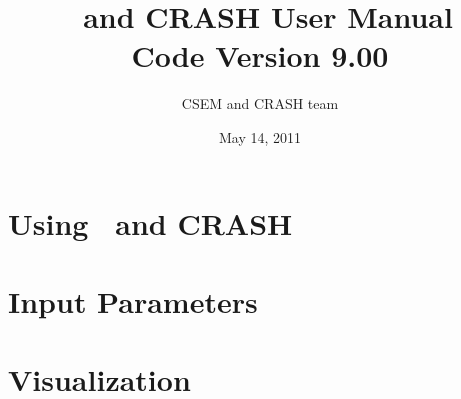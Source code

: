\documentclass[twoside,10pt]{book}
\title{\BATSRUS\ and CRASH User Manual \\ \large Code Version 9.00}
\author{CSEM and CRASH team}
\date{May 14, 2011}
\begin{document}
\pagestyle{fancy}
\lhead[\fancyplain{}{\bfseries\thepage}]{\fancyplain{}{\bfseries\rightmark}}
\rhead[\fancyplain{}{\bfseries\leftmark}]{\fancyplain{}{\bfseries\thepage}}
\cfoot{}

\maketitle

\tableofcontents



\chapter{Using \BATSRUS\ and CRASH \label{chapter:usage}}





\chapter{Input Parameters \label{chapter:param}}






\chapter{Visualization \label{chapter:visualization}}





%
\end{document}
